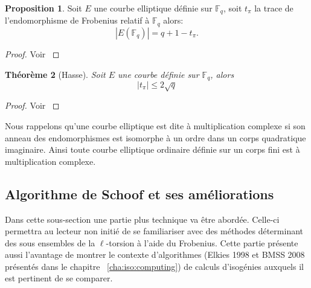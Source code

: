 \documentclass[10pt,a4paper]{book}
\theoremstyle{plain}
\newtheorem{thm}{Théorème}[chapter]
\theoremstyle{definition}
\theoremstyle{definition}
\theoremstyle{definition}
\theoremstyle{definition}
\newtheorem{prop}[thm]{Proposition}
\theoremstyle{definition}
\newtheorem{defi}[thm]{Définition}
\theoremstyle{remark}
\theoremstyle{remark}
\theoremstyle{definition}
\begin{document}
\begin{prop}
Soit $E$ une courbe elliptique définie sur $\mathbb{F}_q$, soit $t_{\pi}$ la trace de l'endomorphisme de Frobenius relatif à $ \mathbb{F}_q$ alors:
\begin{equation*}
|E(\mathbb{F}_q)|=q+1-t_{\pi}.
\end{equation*}
\end{prop}

\begin{proof}
Voir \cite[Theorem V.1.1]{Silv1}
\end{proof}

\begin{thm}[Hasse]
Soit $E$ une courbe définie sur $\mathbb{F}_q$, alors 
\begin{equation}
|t_{\pi}| \leqslant 2 \sqrt{q}
\end{equation}
\end{thm}

\begin{proof}
Voir \cite[Theorem V.1.1]{Silv1}
\end{proof}

Nous rappelons qu'une courbe elliptique est dite à multiplication complexe si
son anneau des endomorphismes est isomorphe à un ordre dans un corps 
quadratique imaginaire. Ainsi toute courbe elliptique ordinaire définie sur un 
corps fini est à multiplication complexe.
%


\subsection{Algorithme de Schoof et ses améliorations}
\label{sub-sec:schoof}
Dans cette sous-section une partie plus technique va être abordée. Celle-ci 
 permettra au lecteur non initié de se 
familiariser avec des méthodes déterminant des sous ensembles de la 
$\ell$-torsion à l'aide du Frobenius.
Cette partie présente aussi l'avantage de 
montrer le contexte d'algorithmes (Elkies 1998 et BMSS 2008 présentés dans le 
chapitre~ \ref{cha:iso:computing}) de calculs d'isogénies auxquels il est 
pertinent de se comparer.
\end{document}
